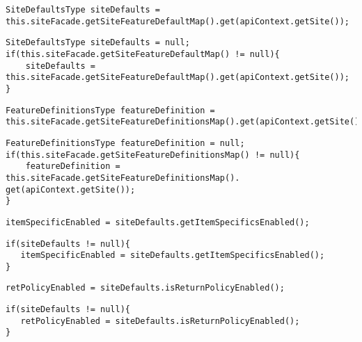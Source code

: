 \begin{lstlisting}[firstnumber=115, caption={get invocation}]
SiteDefaultsType siteDefaults = this.siteFacade.getSiteFeatureDefaultMap().get(apiContext.getSite());
\end{lstlisting}
\begin{lstlisting}[firstnumber=115, caption={get invocation possible solution}]
SiteDefaultsType siteDefaults = null;
if(this.siteFacade.getSiteFeatureDefaultMap() != null){
    siteDefaults = this.siteFacade.getSiteFeatureDefaultMap().get(apiContext.getSite());
}
\end{lstlisting}
\noindent\makebox[\linewidth]{\rule{\linewidth}{0.4pt}}

\begin{lstlisting}[firstnumber=116, caption={get invocation}]
FeatureDefinitionsType featureDefinition = this.siteFacade.getSiteFeatureDefinitionsMap().get(apiContext.getSite());
\end{lstlisting}
\begin{lstlisting}[firstnumber=116, caption={get invocation possible solution}]
FeatureDefinitionsType featureDefinition = null;
if(this.siteFacade.getSiteFeatureDefinitionsMap() != null){
    featureDefinition = this.siteFacade.getSiteFeatureDefinitionsMap(). get(apiContext.getSite());
}
\end{lstlisting}
\noindent\makebox[\linewidth]{\rule{\linewidth}{0.4pt}}

\begin{lstlisting}[firstnumber=121, caption={getItemSpecificsEnabled invocation}]
itemSpecificEnabled = siteDefaults.getItemSpecificsEnabled();
\end{lstlisting}
\begin{lstlisting}[firstnumber=121, caption={getItemSpecificsEnabled invocation possible solution}]
if(siteDefaults != null){
   itemSpecificEnabled = siteDefaults.getItemSpecificsEnabled();
}
\end{lstlisting}
\noindent\makebox[\linewidth]{\rule{\linewidth}{0.4pt}}

\begin{lstlisting}[firstnumber=126, caption={isReturnPolicyEnabled invocation}]
retPolicyEnabled = siteDefaults.isReturnPolicyEnabled();
\end{lstlisting}
\begin{lstlisting}[firstnumber=126, caption={isReturnPolicyEnabled invocation possible solution}]
if(siteDefaults != null){
   retPolicyEnabled = siteDefaults.isReturnPolicyEnabled();
}
\end{lstlisting}
\noindent\makebox[\linewidth]{\rule{\linewidth}{0.4pt}}

